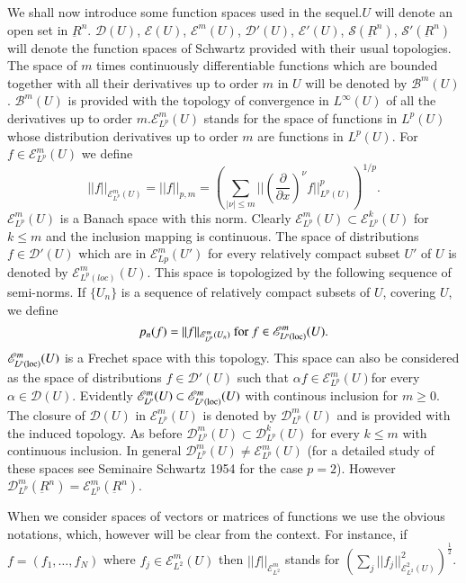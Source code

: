 We shall now introduce some function spaces used in the
sequel.\pageoriginale $U$ 
will denote an open set in $\underbar{R}^n$. $\mathscr{D} (U)$,
$\mathscr{E}(U)$, $\mathscr{E}^m(U)$, $\mathscr{D'}(U)$,
$\mathscr{E'}(U)$, $\mathscr{S} (\underbar{R}^n)$, $\mathscr{S}'
(\underbar{R}^n)$ will denote the function spaces of Schwartz
provided with their usual topologies. The space of $m$ times
continuously differentiable functions which are bounded together with
all their derivatives up to order $m$ in $U$ will be denoted by
$\mathscr{B}^m(U)$. $\mathscr{B}^m(U)$ is provided with the topology
of convergence in $ L^ \infty (U)$ of all the derivatives up to order
$m. \mathscr{E}^m_{L^p}(U)$ stands for the space of functions in
$L^{p} (U)$ whose distribution derivatives up to order $m$ are
functions in $L^p (U)$. For $f \in \mathscr{E}^m_{L^p} (U)$ we define 
$$
||f ||_{\mathscr{E}^m_{L^p}(U)} = || f ||_{p, m} = (\sum\limits_{|
  \nu | \leq m} || \left(\frac{\partial}{\partial x}\right)^\nu f||^p_{L^p
  (U)})^{1/p}. 
$$
$\mathscr{E}^m_{L^{p}}(U)$ is a Banach space with this norm. Clearly
$\mathscr{E}^m_{L^p} (U) \subset \mathscr{E}^k_{L^p} (U)$ for $k \leq
m$ and the inclusion mapping is continuous. The space of distributions
$f \in \mathscr{D}' (U)$ which are in $\mathscr{E}^m_{L{p}}(U')$ for
every relatively compact subset $U'$ of $U$ is denoted by
$\mathscr{E}^m_{L^p(loc)}(U)$. This space is topologized by the
following sequence of semi-norms. If $\{U_n\}$ is a sequence of
relatively compact subsets of $U$,  covering $U$,  we define 
$$
p_n (f) = ||f||_{\mathscr{E}^{m}_{L^p}(U_n)}  \text{ for }  f
\in \mathscr{E}^m_{L^p (\operatorname{loc})} (U).  
$$
$\mathscr{E}^m_{L^p(\operatorname{loc})} (U)$ is a Frechet space with this
topology. This space can also be considered as the space of 
distributions $f \in  \mathscr{D'} (U)$ such that  $\alpha f
\in \mathscr{E}^m_{L^p} (U)$\pageoriginale for every  $\alpha
\in \mathscr{D}(U)$. Evidently $\mathscr{E}^m_{L^p} (U) \subset
\mathscr{E}^m_{L^p(\operatorname{loc})} (U)$ with continous inclusion for $m \geq
0$. The closure of $\mathscr{D}(U)$ in $ \mathscr{E}^m_{L^p}(U)$ is
denoted by $\mathscr{D}^m_{L^p}(U)$ and is provided with the induced
topology. As before  $\mathscr{D}^m_{L^p}(U) \subset
\mathscr{D}^k_{L^p}(U)$ for every $k \leq m$ with continuous
inclusion. In general $\mathscr{D}^m_{L^p} (U) \neq
\mathscr{E}^m_{L^p}(U)$  (for a detailed study of these spaces see
Seminaire Schwartz 1954 for the case $p=2$). However
$\mathscr{D}^m_{L^p} (\underbar{R}^n) = \mathscr{E}^m_{L^p}
(\underbar{R}^n)$. 

When we consider spaces of vectors or matrices of functions we use the
obvious notations,  which,  however will be clear from the
context. For instance,  if $f = (f_1,  \ldots,  f_N)$ where $f_j
\in \mathscr{E}^m_{L^2}(U)$ then $||f||_{\mathscr{E}^m_{L^2}}$ stands for
$\left(\sum \limits_j || f_j ||^2_{\mathscr{E}^2_{L^{2}}(U)}\right)^{\frac{1}{2}}$. 


